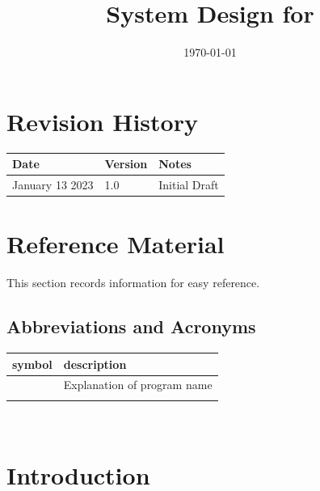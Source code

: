 \documentclass[12pt, titlepage]{article}
\begin{document}
	
	\title{System Design for \progname{}} 
	\author{\authname}
	\date{\today}
	
	\maketitle
	
	
	\section{Revision History}
	
	\begin{tabularx}{\textwidth}{p{3cm}p{2cm}X}
		\toprule {\bf Date} & {\bf Version} & {\bf Notes}\\
		\midrule
		January 13 2023 & 1.0 & Initial Draft\\
		\bottomrule
	\end{tabularx}
	
	\newpage
	
	\section{Reference Material}
	
	This section records information for easy reference.
	
	\subsection{Abbreviations and Acronyms}
	
	\renewcommand{\arraystretch}{1.2}
	\begin{tabular}{l l} 
		\toprule		
		\textbf{symbol} & \textbf{description}\\
		\midrule 
		\progname & Explanation of program name\\
		\wss{...} & \wss{...}\\
		\bottomrule
	\end{tabular}\\
	
	\newpage
	
	\tableofcontents
	
	\newpage
	
	\listoftables
	
	\listoffigures
	
	\newpage
	
	
	\section{Introduction}
	
\end{document}
